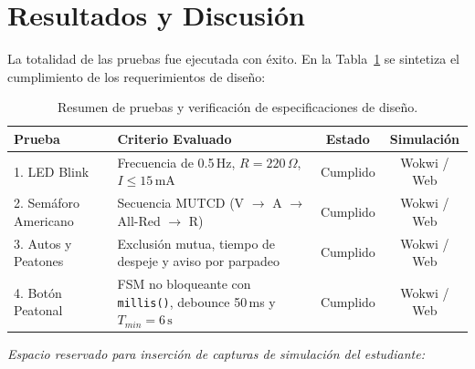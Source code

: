 \documentclass[12pt,a4paper]{article}
\begin{document}
\section{Resultados y Discusión}
La totalidad de las pruebas fue ejecutada con éxito. En la Tabla~\ref{tab:resumen_pruebas} se sintetiza el cumplimiento de los requerimientos de diseño:

\begin{table}[H]
\centering
\caption{Resumen de pruebas y verificación de especificaciones de diseño.}
\label{tab:resumen_pruebas}
\begin{tabular}{lp{6.5cm}cc}
\toprule
\textbf{Prueba} & \textbf{Criterio Evaluado} & \textbf{Estado} & \textbf{Simulación} \\
\midrule
1. LED Blink & Frecuencia de 0.5\,Hz, $R = 220\,\Omega$, $I \le 15\,\text{mA}$ & Cumplido & Wokwi / Web \\
2. Semáforo Americano & Secuencia MUTCD (V $\rightarrow$ A $\rightarrow$ All-Red $\rightarrow$ R) & Cumplido & Wokwi / Web \\
3. Autos y Peatones & Exclusión mutua, tiempo de despeje y aviso por parpadeo & Cumplido & Wokwi / Web \\
4. Botón Peatonal & FSM no bloqueante con \texttt{millis()}, debounce 50\,ms y $T_{min} = 6\,\text{s}$ & Cumplido & Wokwi / Web \\
\bottomrule
\end{tabular}
\end{table}

\textit{Espacio reservado para inserción de capturas de simulación del estudiante:}
\begin{center}
\end{center}

\end{document}
